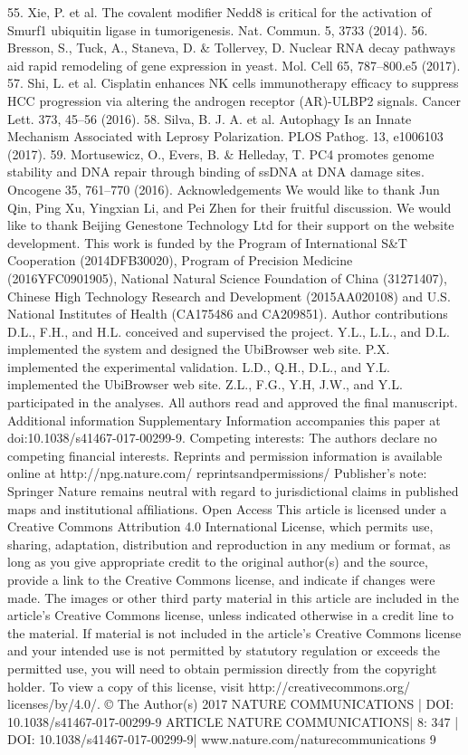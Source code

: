 55. Xie, P. et al. The covalent modiﬁer Nedd8 is critical for the activation of Smurf1
ubiquitin ligase in tumorigenesis. Nat. Commun. 5, 3733 (2014).
56. Bresson, S., Tuck, A., Staneva, D. \& Tollervey, D. Nuclear RNA decay pathways
aid rapid remodeling of gene expression in yeast. Mol. Cell 65, 787–800.e5
(2017).
57. Shi, L. et al. Cisplatin enhances NK cells immunotherapy efﬁcacy to suppress
HCC progression via altering the androgen receptor (AR)-ULBP2 signals.
Cancer Lett. 373, 45–56 (2016).
58. Silva, B. J. A. et al. Autophagy Is an Innate Mechanism Associated with Leprosy
Polarization. PLOS Pathog. 13, e1006103 (2017).
59. Mortusewicz, O., Evers, B. \& Helleday, T. PC4 promotes genome stability and
DNA repair through binding of ssDNA at DNA damage sites. Oncogene 35,
761–770 (2016).
Acknowledgements
We would like to thank Jun Qin, Ping Xu, Yingxian Li, and Pei Zhen for their fruitful
discussion. We would like to thank Beijing Genestone Technology Ltd for their support
on the website development. This work is funded by the Program of International S\&T
Cooperation (2014DFB30020), Program of Precision Medicine (2016YFC0901905),
National Natural Science Foundation of China (31271407), Chinese High
Technology Research and Development (2015AA020108) and U.S. National Institutes of
Health (CA175486 and CA209851).
Author contributions
D.L., F.H., and H.L. conceived and supervised the project. Y.L., L.L., and D.L.
implemented the system and designed the UbiBrowser web site. P.X. implemented the
experimental validation. L.D., Q.H., D.L., and Y.L. implemented the UbiBrowser web site.
Z.L., F.G., Y.H, J.W., and Y.L. participated in the analyses. All authors read and approved
the ﬁnal manuscript.
Additional information
Supplementary Information accompanies this paper at doi:10.1038/s41467-017-00299-9.
Competing interests: The authors declare no competing ﬁnancial interests.
Reprints and permission information is available online at http://npg.nature.com/
reprintsandpermissions/
Publisher's note: Springer Nature remains neutral with regard to jurisdictional claims in
published maps and institutional afﬁliations.
Open Access This article is licensed under a Creative Commons
Attribution 4.0 International License, which permits use, sharing,
adaptation, distribution and reproduction in any medium or format, as long as you give
appropriate credit to the original author(s) and the source, provide a link to the Creative
Commons license, and indicate if changes were made. The images or other third party
material in this article are included in the article’s Creative Commons license, unless
indicated otherwise in a credit line to the material. If material is not included in the
article’s Creative Commons license and your intended use is not permitted by statutory
regulation or exceeds the permitted use, you will need to obtain permission directly from
the copyright holder. To view a copy of this license, visit http://creativecommons.org/
licenses/by/4.0/.
© The Author(s) 2017
NATURE COMMUNICATIONS | DOI: 10.1038/s41467-017-00299-9
ARTICLE
NATURE COMMUNICATIONS| 8:  347
| DOI: 10.1038/s41467-017-00299-9| www.nature.com/naturecommunications
9

